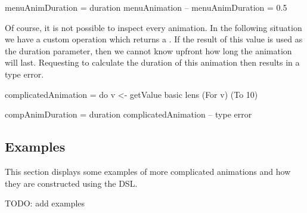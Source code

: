 \begin{spec}
menuAnimDuration = duration menuAnimation
-- menuAnimDuration = 0.5 
\end{spec}

Of course, it is not possible to inspect every animation. In the following situation we have a custom operation  which returns a . If the result of this value is used as the duration parameter, then we cannot know upfront how long the animation will last. Requesting to calculate the duration of this animation then results in a type error.

\begin{spec}
complicatedAnimation = do
  v <- getValue
  basic lens (For v) (To 10)

compAnimDuration = duration complicatedAnimation
-- type error
\end{spec}

\subsection{Examples}

This section displays some examples of more complicated animations and how they are constructed using the DSL.

TODO: add examples
